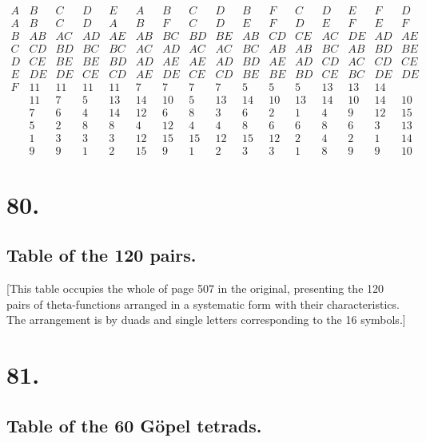 \documentclass[11pt,a4paper]{article}
\begin{document}
\[
\begin{array}{cccccccccccccccc}
A & B & C & D & E & A & B & C & D & B & F & C & D & E & F & D \\
\hline
A & B & C & D & A & B & F & C & D & E & F & D & E & F & E & F \\
B & AB & AC & AD & AE & AB & BC & BD & BE & AB & CD & CE & AC & DE & AD & AE \\
C & CD & BD & BC & BC & AC & AD & AC & AC & BC & AB & AB & BC & AB & BD & BE \\
D & CE & BE & BE & BD & AD & AE & AE & AD & BD & AE & AD & CD & AC & CD & CE \\
E & DE & DE & CE & CD & AE & DE & CE & CD & BE & BE & BD & CE & BC & DE & DE \\
F & 11 & 11 & 11 & 11 & 7 & 7 & 7 & 7 & 5 & 5 & 5 & 13 & 13 & 14 \\
& 11 & 7 & 5 & 13 & 14 & 10 & 5 & 13 & 14 & 10 & 13 & 14 & 10 & 14 & 10 \\
& 7 & 6 & 4 & 14 & 12 & 6 & 8 & 3 & 6 & 2 & 1 & 4 & 9 & 12 & 15 \\
& 5 & 2 & 8 & 8 & 4 & 12 & 4 & 4 & 8 & 6 & 6 & 8 & 6 & 3 & 13 \\
& 1 & 3 & 3 & 3 & 12 & 15 & 15 & 12 & 15 & 12 & 2 & 4 & 2 & 1 & 14 \\
& 9 & 9 & 1 & 2 & 15 & 9 & 1 & 2 & 3 & 3 & 1 & 8 & 9 & 9 & 10
\end{array}
\]

\newpage
\section*{80.}
\label{sec:80}

\subsection*{Table of the 120 pairs.}

[This table occupies the whole of page 507 in the original, presenting the 120 pairs of theta-functions arranged in a systematic form with their characteristics. The arrangement is by duads and single letters corresponding to the 16 symbols.]

\newpage
\section*{81.}
\label{sec:81}

\subsection*{Table of the 60 G\"{o}pel tetrads.}
\end{document}
